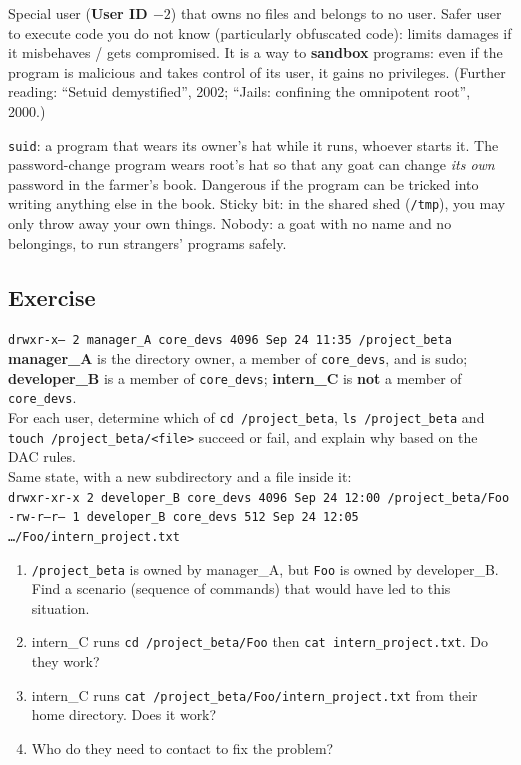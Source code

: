 \begin{defnbox}[title=Nobody]
Special user (\textbf{User ID $-2$}) that owns no files and belongs to no user. Safer
user to execute code you do not know (particularly obfuscated code): limits damages if it
misbehaves / gets compromised. It is a way to \textbf{sandbox} programs: even if the program is
malicious and takes control of its user, it gains no privileges. (Further reading: ``Setuid
demystified'', 2002; ``Jails: confining the omnipotent root'', 2000.)
\end{defnbox}

\begin{goatbox}
\texttt{suid}: a program that wears its owner's hat while it runs, whoever starts it. The
password-change program wears root's hat so that any goat can change \emph{its own} password in
the farmer's book. Dangerous if the program can be tricked into writing anything else in the
book. Sticky bit: in the shared shed (\texttt{/tmp}), you may only throw away your own things.
Nobody: a goat with no name and no belongings, to run strangers' programs safely.
\end{goatbox}

\subsection{Exercise}

\begin{exbox}[title={Exercise --- ACL in Linux}]
\texttt{drwxr-x--- 2 manager\_A core\_devs 4096 Sep 24 11:35 /project\_beta} \\
\textbf{manager\_A} is the directory owner, a member of \texttt{core\_devs}, and is
sudo; \textbf{developer\_B} is a member of \texttt{core\_devs}; \textbf{intern\_C} is
\textbf{not} a member of \texttt{core\_devs}. \\
For each user, determine which of \texttt{cd /project\_beta}, \texttt{ls /project\_beta}
and \texttt{touch /project\_beta/<file>} succeed or fail, and explain why based on the DAC
rules. \\[4pt]
Same state, with a new subdirectory and a file inside it: \\
\texttt{drwxr-xr-x 2 developer\_B core\_devs 4096 Sep 24 12:00 /project\_beta/Foo} \\
\texttt{-rw-r--r-- 1 developer\_B core\_devs 512 Sep 24 12:05 \ldots/Foo/intern\_project.txt}
\begin{enumerate}[label=Q\arabic*:]
  \item \texttt{/project\_beta} is owned by manager\_A, but \texttt{Foo} is owned by
        developer\_B. Find a scenario (sequence of commands) that would have led to this
        situation.
  \item intern\_C runs \texttt{cd /project\_beta/Foo} then
        \texttt{cat intern\_project.txt}. Do they work?
  \item intern\_C runs \texttt{cat /project\_beta/Foo/intern\_project.txt} from their
        home directory. Does it work?
  \item Who do they need to contact to fix the problem?
\end{enumerate}
\end{exbox}

